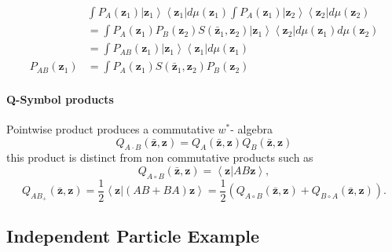 \documentclass[aps,preprint]{revtex4}%
\begin{document}
\begin{align}
&  \int P_{A}\left(  \mathbf{z}_{1}\right)  \left\vert \mathbf{z}%
_{1}\right\rangle \left\langle \mathbf{z}_{1}\right\vert d\mu\left(
\mathbf{z}_{1}\right)  \int P_{A}\left(  \mathbf{z}_{1}\right)  \left\vert
\mathbf{z}_{2}\right\rangle \left\langle \mathbf{z}_{2}\right\vert d\mu\left(
\mathbf{z}_{2}\right) \\
&  =\int P_{A}\left(  \mathbf{z}_{1}\right)  P_{B}\left(  \mathbf{z}%
_{2}\right)  S\left(  \mathbf{\bar{z}}_{1},\mathbf{z}_{2}\right)  \left\vert
\mathbf{z}_{1}\right\rangle \left\langle \mathbf{z}_{2}\right\vert d\mu\left(
\mathbf{z}_{1}\right)  d\mu\left(  \mathbf{z}_{2}\right) \\
&  =\int P_{AB}\left(  \mathbf{z}_{1}\right)  \left\vert \mathbf{z}%
_{1}\right\rangle \left\langle \mathbf{z}_{1}\right\vert d\mu\left(
\mathbf{z}_{1}\right) \\
P_{AB}\left(  \mathbf{z}_{1}\right)   &  =\int P_{A}\left(  \mathbf{z}%
_{1}\right)  S\left(  \mathbf{\bar{z}}_{1},\mathbf{z}_{2}\right)  P_{B}\left(
\mathbf{z}_{2}\right)
\end{align}


\paragraph{Q-Symbol products}

Pointwise product produces a commutative $w^{\ast}$- algebra
\begin{equation}
Q_{A\cdot B}\left(  \mathbf{\bar{z}},\mathbf{z}\right)  =Q_{A}\left(
\mathbf{\bar{z}},\mathbf{z}\right)  Q_{B}\left(  \mathbf{\bar{z}}%
,\mathbf{z}\right)
\end{equation}
this product is distinct from non commutative products such as
\begin{equation}
Q_{A\circ B}\left(  \mathbf{\bar{z}},\mathbf{z}\right)  =\left\langle
\mathbf{z}\left\vert AB\mathbf{z}\right.  \right\rangle ,
\end{equation}%
\begin{equation}
Q_{AB_{+}}\left(  \mathbf{\bar{z}},\mathbf{z}\right)  =\frac{1}{2}\left\langle
\mathbf{z}\left\vert \left(  AB+BA\right)  \mathbf{z}\right.  \right\rangle
=\frac{1}{2}\left(  Q_{A\circ B}\left(  \mathbf{\bar{z}},\mathbf{z}\right)
+Q_{B\circ A}\left(  \mathbf{\bar{z}},\mathbf{z}\right)  \right)  .
\end{equation}


\subsection{Independent Particle Example}
\end{document}
